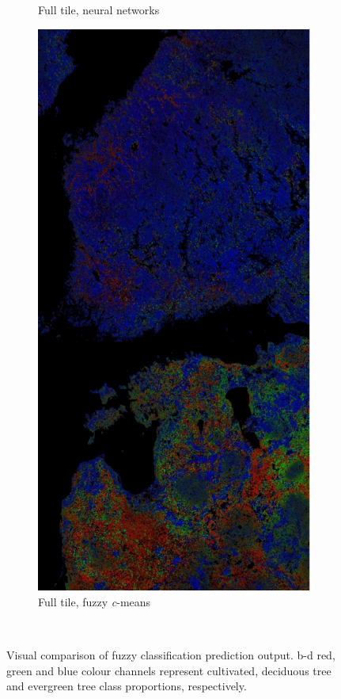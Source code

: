 \documentclass[a4paper,12pt]{scrbook}
\begin{document}
\begin{figure}
\begin{subfigure}[t]{.24\textwidth}
    \caption{Full tile, neural networks}
  \end{subfigure} \hfill
  \begin{subfigure}[t]{.24\textwidth}
    \includegraphics[width=\textwidth]{thesis-figures/figures-qgis/fulltile-cm}
    \caption{Full tile, fuzzy \textit{c}-means}
    \label{subfig-fulltile-cm}
  \end{subfigure} \
  \caption{Visual comparison of fuzzy classification prediction output. b-d red, green and blue colour channels represent cultivated, deciduous tree and evergreen tree class proportions, respectively.}
\end{figure}
\end{document}
